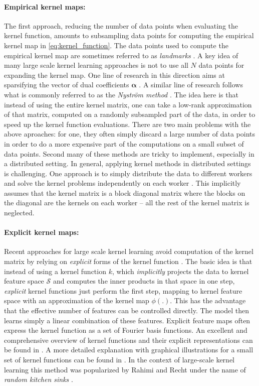 \documentclass{article} %
\newcommand{\va}{\boldsymbol{\alpha}}
\begin{document}
\paragraph{Empirical kernel maps:} The first approach, reducing the number of data points when evaluating the kernel function, amounts to subsampling data points for computing the empirical kernel map in \autoref{eq:kernel_function}. 
The data points used to compute the empirical kernel map are sometimes referred to as {\em landmarks} \cite{Hsieh2014}. A key idea of many large scale kernel learning approaches is not to use all $N$ data points for expanding the kernel map. One line of research in this direction aims at sparsifying the vector of dual coefficients $\va$ \cite{WilsonN15, LiangP15}. 
A similar line of research follows what is commonly referred to as the {\em Nystr\"om method} \cite{Williams2000}. The idea here is that instead of using the entire kernel matrix, one can take a low-rank approximation of that matrix, computed on a randomly subsampled part of the data, in order to speed up the kernel function evaluations. There are two main problems with the above aproaches: for one, they often simply discard a large number of data points in order to do a more expensive part of the computations on a small subset of data points. Second many of these methods are tricky to implement, especially in a distributed setting. In general, applying kernel methods in distributed settings is challenging. One approach is to simply distribute the data to different workers and solve the kernel problems independently on each worker \cite{Deisenroth2015}. This implicitly assumes that the kernel matrix is a block diagonal matrix where the blocks on the diagonal are the kernels on each worker -- all the rest of the kernel matrix is neglected.

\paragraph{Explicit kernel maps:} Recent approaches for large scale kernel learning avoid computation of the kernel matrix by relying on {\em explicit} forms of the kernel function \cite{Rahimi2008,Vedaldi2010}. The basic idea is that instead of using a kernel function $k$, which {\em implicitly} projects the data to kernel feature space $\mathcal{S}$ and computes the inner products in that space in one step, {\em explicit} kernel functions just perform the first step, mapping to kernel feature space with an approximation of the kernel map $\phi(.)$. This has the advantage that the effective number of features can be controlled directly. The model then learns simply a linear combination of these features. Explicit feature maps often express the kernel function as a set of Fourier basis functions. An excellent and comprehensive overview of kernel functions and their explicit representations can be found in \cite{Dai2014}. A more detailed explanation with graphical illustrations for a small set of kernel functions can be found in \cite{Vedaldi2010}. In the context of large-scale kernel learning this method was popularized by Rahimi and Recht under the name of {\em random kitchen sinks} \cite{Rahimi2008}. 
\end{document}
